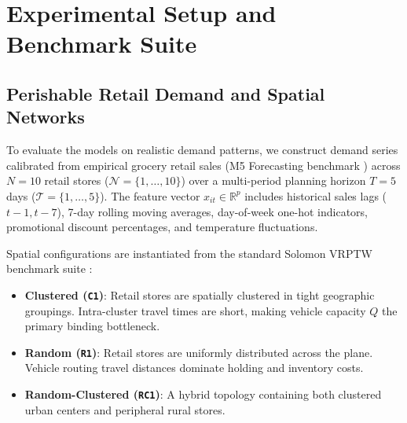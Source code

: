 \documentclass[11pt,a4paper]{article}
\theoremstyle{definition}
\theoremstyle{remark}
\begin{document}
\section{Experimental Setup and Benchmark Suite}
\label{sec:experimental_setup}

\subsection{Perishable Retail Demand and Spatial Networks}
\label{subsec:networks}
To evaluate the models on realistic demand patterns, we construct demand series calibrated from empirical grocery retail sales (M5 Forecasting benchmark \citep{makridakis2022m5}) across $N = 10$ retail stores ($\mathcal{N} = \{1, \dots, 10\}$) over a multi-period planning horizon $T = 5$ days ($\mathcal{T} = \{1, \dots, 5\}$). The feature vector $x_{it} \in \mathbb{R}^p$ includes historical sales lags ($t-1, t-7$), 7-day rolling moving averages, day-of-week one-hot indicators, promotional discount percentages, and temperature fluctuations.

Spatial configurations are instantiated from the standard Solomon VRPTW benchmark suite \citep{solomon1987algorithms}:
\begin{itemize}[leftmargin=*]
    \item \textbf{Clustered (\texttt{C1})}: Retail stores are spatially clustered in tight geographic groupings. Intra-cluster travel times are short, making vehicle capacity $Q$ the primary binding bottleneck.
    \item \textbf{Random (\texttt{R1})}: Retail stores are uniformly distributed across the plane. Vehicle routing travel distances dominate holding and inventory costs.
    \item \textbf{Random-Clustered (\texttt{RC1})}: A hybrid topology containing both clustered urban centers and peripheral rural stores.
\end{itemize}
\end{document}
